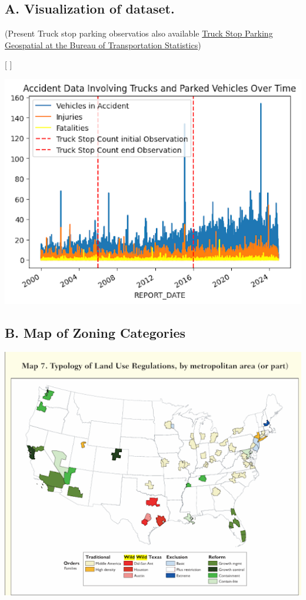 \documentclass[
  12pt]{article}
\begin{document}
\subsection{\texorpdfstring{\textbf{A. Visualization of
dataset.}}{A. Visualization of dataset.}}\label{sec-a.-visualization-of-dataset.-}

(Present Truck stop parking observatios also available
\href{https://data-usdot.opendata.arcgis.com/datasets/usdot::truck-stop-parking/about}{Truck
Stop Parking \textbar{} Geospatial at the Bureau of Transportation
Statistics})

{[} \citet{coWilliamClintCResearchProposalTrucks2024}{]}

\includegraphics{images/unnamed.png}

\subsection{B. Map of Zoning
Categories}\label{sec-b.-map-of-zoning-categories}

\includegraphics{images/unnamed (1).png}


  
\end{document}
